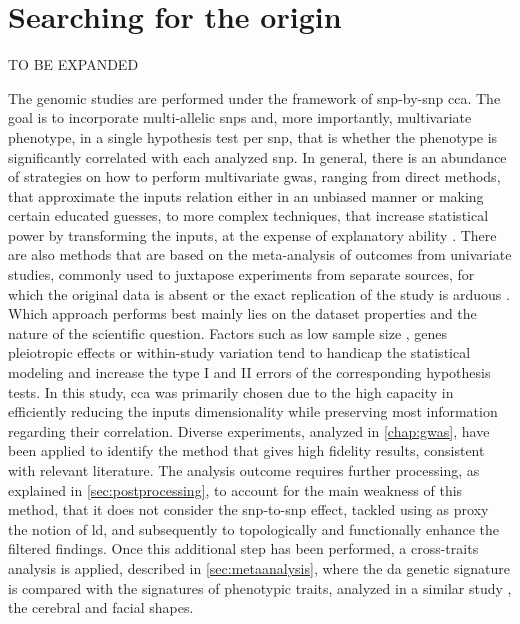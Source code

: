 \section{Searching for the origin}
TO BE EXPANDED

The genomic studies are performed under the framework of \ac{snp}-by-\ac{snp} \ac{cca}. The goal is to incorporate multi-allelic \acsp{snp} and, more importantly, multivariate phenotype, in a single hypothesis test per \ac{snp}, that is whether the phenotype is significantly correlated with each analyzed \ac{snp}. In general, there is an abundance of strategies on how to perform multivariate \ac{gwas}, ranging from direct methods, that approximate the inputs relation either in an unbiased manner or making certain educated guesses, to more complex techniques, that increase statistical power by transforming the inputs, at the expense of explanatory ability \cite{Galesloot2014}. There are also methods that are based on the meta-analysis of outcomes from univariate studies, commonly used to juxtapose experiments from separate sources, for which the original data is absent or the exact replication of the study is arduous \cite{Cichonska2016}. Which approach performs best mainly lies on the dataset properties and the nature of the scientific question. Factors such as low sample size \cite{Sheng2021}, genes pleiotropic effects \cite{Fernandes2021} or within-study variation \cite{Jackson2011} tend to handicap the statistical modeling and increase the type I and II errors of the corresponding hypothesis tests. In this study, \ac{cca} was primarily chosen due to the high capacity in efficiently reducing the inputs dimensionality while preserving most information regarding their correlation. Diverse experiments, analyzed in \autoref{chap:gwas}, have been applied to identify the method that gives high fidelity results, consistent with relevant literature. The analysis outcome requires further processing, as explained in \autoref{sec:postprocessing}, to account for the main weakness of this method, that it does not consider the \ac{snp}-to-\ac{snp} effect, tackled using as proxy the notion of \ac{ld}, and subsequently to topologically and functionally enhance the filtered findings. Once this additional step has been performed, a cross-traits analysis is applied, described in \autoref{sec:metaanalysis}, where the \ac{da} genetic signature is compared with the signatures of phenotypic traits, analyzed in a similar study \cite{Naqvi2021}, the cerebral and facial shapes.


